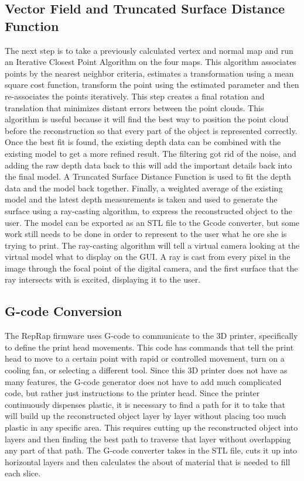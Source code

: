 \documentclass[pdftex,10.5pt]{report}
\begin{document}
\subsection{Vector Field and Truncated Surface Distance Function}
The next step is to take a previously calculated vertex and normal map and run an Iterative Closest Point Algorithm on the four maps. This algorithm associates points by the nearest neighbor criteria, estimates a transformation using a mean square cost function, transform the point using the estimated parameter and then re-associates the points iteratively. This step creates a final rotation and translation that minimizes distant errors between the point clouds. This algorithm is useful because it will find the best way to position the point cloud before the reconstruction so that every part of the object is represented correctly. Once the best fit is found, the existing depth data can be combined with the existing model to get a more refined result. The filtering got rid of the noise, and adding the raw depth data back to this will add the important details back into the final model. A Truncated Surface Distance Function is used to fit the depth data and the model back together. Finally, a weighted average of the existing model and the latest depth measurements is taken and used to generate the surface using a ray-casting algorithm, to express the reconstructed object to the user. The model can be exported as an STL file to the Gcode converter, but some work still needs to be done in order to represent to the user what he ore she is trying to print. The ray-casting algorithm will tell a virtual camera looking at the virtual model what to display on the GUI. A ray is cast from every pixel in the image through the focal point of the digital camera, and the first surface that the ray intersects with is excited, displaying it to the user.  \cite{cite8}


\subsection{G-code Conversion}
The RepRap firmware uses G-code to communicate to the 3D printer, specifically to define the print head movements. This code has commands that tell the print head to move to a certain point with rapid or controlled movement, turn on a cooling fan, or selecting a different tool. Since this 3D printer does not have as many features, the G-code generator does not have to add much complicated code, but rather just instructions to the printer head. Since the printer continuously dispenses plastic, it is necessary to find a path for it to take that will build up the reconstructed object layer by layer without placing too much plastic in any specific area. This requires cutting up the reconstructed object into layers and then finding the best path to traverse that layer without overlapping any part of that path. The G-code converter takes in the STL file, cuts it up into horizontal layers and then calculates the about of material that is needed to fill each slice. 
\end{document}
